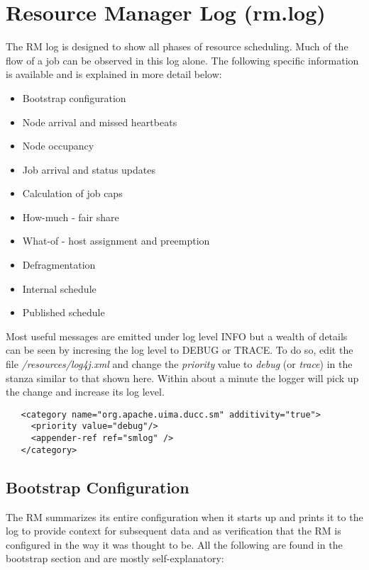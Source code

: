 \section{Resource Manager Log (rm.log)}

    The RM log is designed to show all phases of resource scheduling.  Much of the flow of a job can
    be observed in this log alone.  The following specific information is available and is explained in
    more detail below:
    \begin{itemize}
      \item Bootstrap configuration
      \item Node arrival and missed heartbeats
      \item Node occupancy
      \item Job arrival and status updates
      \item Calculation of job caps
      \item How-much - fair share 
      \item What-of - host assignment and preemption
      \item Defragmentation
      \item Internal schedule
      \item Published schedule
    \end{itemize}

    Most useful messages are emitted under log level INFO but a wealth of details can
    be seen by incresing the log level to DEBUG or TRACE.  To do so, 
    edit the file 
    {\em  \ducchome/resources/log4j.xml}
    and change the {\em priority} value to {\em debug} (or {\em trace}) in the stanza
    similar to that shown here.  Within about a minute the logger will
    pick up the change and increase its log level.
\begin{verbatim}
   <category name="org.apache.uima.ducc.sm" additivity="true">
     <priority value="debug"/>
     <appender-ref ref="smlog" /> 
   </category>
\end{verbatim}
    
\subsection{Bootstrap Configuration}
   The RM summarizes its entire configuration when it starts up and prints it to the log to
   provide context for subsequent data and as verification that the RM is configured in the
   way it was thought to be.  All the following are found in the bootstrap section and are mostly
   self-explanatory:

